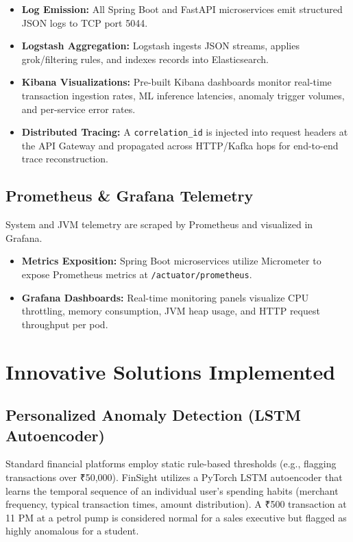 \documentclass[12pt,a4paper]{report}
\begin{document}
\begin{itemize}[leftmargin=1.5em]
  \item \textbf{Log Emission:} All Spring Boot and FastAPI microservices emit structured JSON logs to TCP port 5044.
  \item \textbf{Logstash Aggregation:} Logstash ingests JSON streams, applies grok/filtering rules, and indexes records into Elasticsearch.
  \item \textbf{Kibana Visualizations:} Pre-built Kibana dashboards monitor real-time transaction ingestion rates, ML inference latencies, anomaly trigger volumes, and per-service error rates.
  \item \textbf{Distributed Tracing:} A \texttt{correlation\_id} is injected into request headers at the API Gateway and propagated across HTTP/Kafka hops for end-to-end trace reconstruction.
\end{itemize}

\section{Prometheus \& Grafana Telemetry}

System and JVM telemetry are scraped by Prometheus and visualized in Grafana.
\begin{itemize}[leftmargin=1.5em]
  \item \textbf{Metrics Exposition:} Spring Boot microservices utilize Micrometer to expose Prometheus metrics at \texttt{/actuator/prometheus}.
  \item \textbf{Grafana Dashboards:} Real-time monitoring panels visualize CPU throttling, memory consumption, JVM heap usage, and HTTP request throughput per pod.
\end{itemize}

\chapter{Innovative Solutions Implemented}

\section{Personalized Anomaly Detection (LSTM Autoencoder)}
Standard financial platforms employ static rule-based thresholds (e.g., flagging transactions over ₹50,000). FinSight utilizes a PyTorch LSTM autoencoder that learns the temporal sequence of an individual user's spending habits (merchant frequency, typical transaction times, amount distribution). A ₹500 transaction at 11 PM at a petrol pump is considered normal for a sales executive but flagged as highly anomalous for a student.
\end{document}
